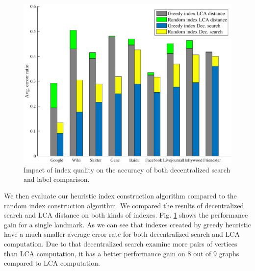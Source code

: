 

\begin{figure}[t]
    \centering
    \includegraphics[width=\linewidth]{../figures/accuracy_index.pdf}
    \caption{Impact of index quality on the accuracy of both decentralized search and label comparison.}
    \label{fig:accuracy_index}
\end{figure}

We then evaluate our heuristic index construction algorithm compared to the random index construction algorithm. We compared the results of decentralized search and LCA distance on both kinds of indexes. Fig. \ref{fig:accuracy_index} shows the performance gain for a single landmark. As we can see that indexes created by greedy heuristic have a much smaller average error rate for both decentralized search and LCA computation. Due to that decentralized search examine more pairs of vertices than LCA computation, it has a better performance gain on $8$ out of $9$ graphs compared to LCA computation.

